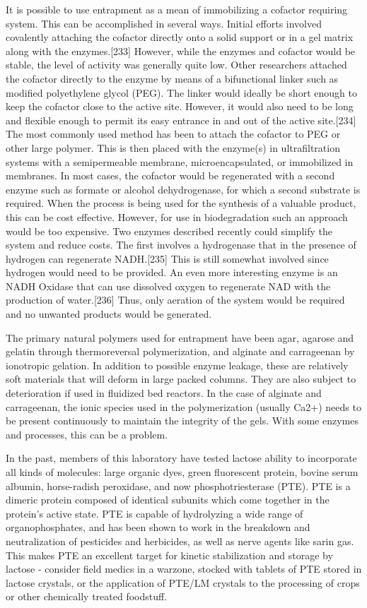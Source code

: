 \begin{refsection}
It is possible to use entrapment as a mean of immobilizing a cofactor requiring
system. This can be accomplished in several ways. Initial efforts involved
covalently attaching the cofactor directly onto a solid
support or in a gel matrix along with the enzymes.[233] However, while the
enzymes and cofactor would be stable, the level of activity was generally quite
low. Other researchers attached the cofactor directly to the enzyme by means of
a bifunctional linker such as modified polyethylene glycol (PEG). The linker
would ideally be short enough to keep the cofactor close to the active site.
However, it would also need to be long and flexible enough to permit its easy
entrance in and out of the active site.[234] The most commonly used method has
been to attach the cofactor to PEG or other large polymer. This is then placed
with the enzyme(s) in ultrafiltration systems with a semipermeable membrane,
microencapsulated, or immobilized in membranes. In most cases, the cofactor
would be regenerated with a second enzyme such as formate or alcohol
dehydrogenase, for which a second substrate is required. When the process is
being used for the synthesis of a valuable product, this can be cost effective.
However, for use in biodegradation such an approach would be too expensive. Two
enzymes described recently could simplify the system and reduce costs. The
first involves a hydrogenase that in the presence of hydrogen can regenerate
NADH.[235] This is still somewhat involved since hydrogen would need to be
provided. An even more interesting enzyme is an NADH Oxidase that can use
dissolved oxygen to regenerate NAD with the production of water.[236] Thus,
only aeration of the system would be required and no unwanted products would be
generated.

The primary natural polymers used for entrapment have been
agar, agarose and gelatin through thermoreversal polymerization, and alginate
and carrageenan by ionotropic gelation. In addition to possible enzyme leakage,
these are relatively soft materials that will deform in large packed columns.
They are also subject to deterioration if used in fluidized bed reactors. In
the case of alginate and carrageenan, the ionic species used in the
polymerization (usually Ca2+) needs to be present continuously to maintain the
integrity of the gels. With some enzymes and processes, this can be a problem.

In the past, members of this laboratory have tested lactose ability to
incorporate all kinds of molecules: large organic dyes, green fluorescent
protein, bovine serum albumin, horse-radish peroxidase, and now
phosphotriesterase (PTE). PTE is a dimeric protein composed of identical
subunits which come together in the protein's active state. PTE is capable of
hydrolyzing a wide range of organophosphates, and has been shown to work in the
breakdown and neutralization of pesticides and herbicides, as well as nerve
agents like sarin gas. This makes PTE an excellent target for kinetic
stabilization and storage by lactose - consider field medics in a warzone,
stocked with tablets of PTE stored in lactose crystals, or the application of
PTE/LM crystals to the processing of crops or other chemically treated
foodstuff.


\end{refsection}
